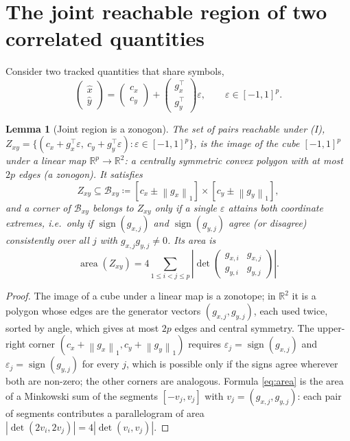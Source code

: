 \documentclass[11pt]{article}
\newtheorem{lemma}[theorem]{Lemma}
\theoremstyle{definition}
\theoremstyle{remark}
\newcommand{\R}{\mathbb{R}}
\newcommand{\eps}{\varepsilon}
\newcommand{\Bx}{\mathcal{B}}
\newcommand{\abs}[1]{\left\lvert #1 \right\rvert}
\newcommand{\norm}[1]{\left\lVert #1 \right\rVert}
\begin{document}
\section{The joint reachable region of two correlated quantities}

Consider two tracked quantities that share symbols,
\begin{equation}
\begin{pmatrix} \hat x\\ \hat y\end{pmatrix} = \begin{pmatrix} c_x\\ c_y\end{pmatrix} + \begin{pmatrix} g_x^\top\\ g_y^\top\end{pmatrix}\eps,\qquad \eps\in[-1,1]^p .
\end{equation}

\begin{lemma}[Joint region is a zonogon]
The set of pairs reachable under (I), $Z_{xy} = \{(c_x + g_x^\top\eps,\ c_y + g_y^\top\eps) : \eps\in[-1,1]^p\}$, is the image of the cube $[-1,1]^p$ under a linear map $\R^p\to\R^2$: a centrally symmetric convex polygon with at most $2p$ edges (a \emph{zonogon}). It satisfies
\begin{equation}
Z_{xy} \subseteq \Bx_{xy} \coloneqq [c_x \pm \norm{g_x}_1] \times [c_y \pm \norm{g_y}_1],
\end{equation}
and a corner of $\Bx_{xy}$ belongs to $Z_{xy}$ only if a single $\eps$ attains both coordinate extremes, i.e.\ only if $\operatorname{sign}(g_{x,j})$ and $\operatorname{sign}(g_{y,j})$ agree (or disagree) consistently over all $j$ with $g_{x,j}g_{y,j}\neq 0$. Its area is
\begin{equation}
\operatorname{area}(Z_{xy}) = 4\sum_{1\le i<j\le p} \abs{\det\begin{pmatrix} g_{x,i} & g_{x,j}\\ g_{y,i} & g_{y,j}\end{pmatrix}} .
\label{eq:area}
\end{equation}
\end{lemma}
\begin{proof}
The image of a cube under a linear map is a zonotope; in $\R^2$ it is a polygon whose edges are the generator vectors $(g_{x,j}, g_{y,j})$, each used twice, sorted by angle, which gives at most $2p$ edges and central symmetry. The upper-right corner $(c_x+\norm{g_x}_1, c_y+\norm{g_y}_1)$ requires $\eps_j = \operatorname{sign}(g_{x,j})$ and $\eps_j = \operatorname{sign}(g_{y,j})$ for every $j$, which is possible only if the signs agree wherever both are non-zero; the other corners are analogous. Formula \eqref{eq:area} is the area of a Minkowski sum of the segments $[-v_j, v_j]$ with $v_j = (g_{x,j}, g_{y,j})$: each pair of segments contributes a parallelogram of area $\abs{\det(2v_i, 2v_j)} = 4\abs{\det(v_i,v_j)}$.
\end{proof}
\end{document}
